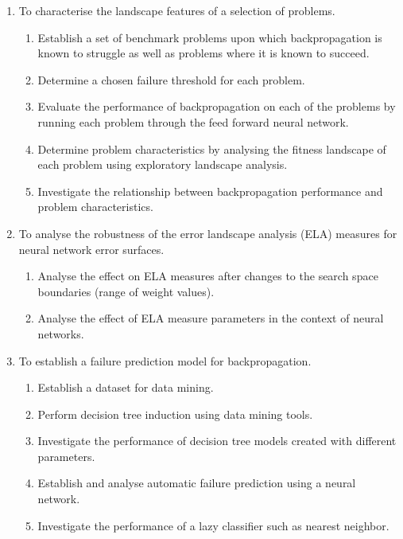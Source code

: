 \documentclass[runningheads,a4paper]{llncs}
\begin{document}
\begin{enumerate}
 \item To characterise the landscape features of a selection of problems.
 \begin{enumerate}
  \item Establish a set of benchmark problems upon which backpropagation is known to struggle as well as problems where it is known to succeed.
  \item Determine a chosen failure threshold for each problem. 
  \item Evaluate the performance of backpropagation on each of the problems by running each problem through the feed forward neural network.
  \item Determine problem characteristics by analysing the fitness landscape of each problem using exploratory landscape analysis.
  \item Investigate the relationship between backpropagation performance and problem characteristics.
 \end{enumerate}
 
  \item To analyse the robustness of the error landscape analysis (ELA) measures for neural network error surfaces.
 \begin{enumerate}
  \item Analyse the effect on ELA measures after changes to the search space boundaries (range of weight values).
  \item Analyse the effect of ELA measure parameters in the context of neural networks.
 \end{enumerate}
 
 \item To establish a failure prediction model for backpropagation.
 \begin{enumerate}
  \item Establish a dataset for data mining.
  \item Perform decision tree induction using data mining tools.
  \item Investigate the performance of decision tree models created with different parameters.
  \item Establish and analyse automatic failure prediction using a neural network.
  \item Investigate the performance of a lazy classifier such as nearest neighbor. 
 \end{enumerate}
 
\end{enumerate}
\end{document}
